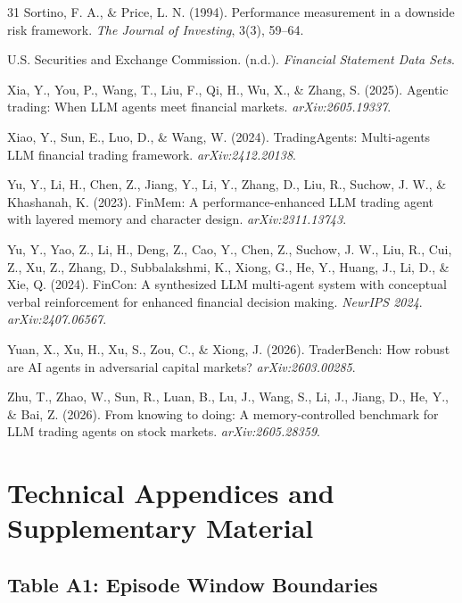 \documentclass{article}
\begin{document}
\begin{thebibliography}{31}
 Sortino, F. A., \& Price, L. N. (1994). Performance measurement in a downside risk framework. \textit{The Journal of Investing}, 3(3), 59--64.

 U.S. Securities and Exchange Commission. (n.d.). \textit{Financial Statement Data Sets}.

 Xia, Y., You, P., Wang, T., Liu, F., Qi, H., Wu, X., \& Zhang, S. (2025). Agentic trading: When LLM agents meet financial markets. \textit{arXiv:2605.19337}.

 Xiao, Y., Sun, E., Luo, D., \& Wang, W. (2024). TradingAgents: Multi-agents LLM financial trading framework. \textit{arXiv:2412.20138}.

 Yu, Y., Li, H., Chen, Z., Jiang, Y., Li, Y., Zhang, D., Liu, R., Suchow, J. W., \& Khashanah, K. (2023). FinMem: A performance-enhanced LLM trading agent with layered memory and character design. \textit{arXiv:2311.13743}.

 Yu, Y., Yao, Z., Li, H., Deng, Z., Cao, Y., Chen, Z., Suchow, J. W., Liu, R., Cui, Z., Xu, Z., Zhang, D., Subbalakshmi, K., Xiong, G., He, Y., Huang, J., Li, D., \& Xie, Q. (2024). FinCon: A synthesized LLM multi-agent system with conceptual verbal reinforcement for enhanced financial decision making. \textit{NeurIPS 2024}. \textit{arXiv:2407.06567}.

 Yuan, X., Xu, H., Xu, S., Zou, C., \& Xiong, J. (2026). TraderBench: How robust are AI agents in adversarial capital markets? \textit{arXiv:2603.00285}.

 Zhu, T., Zhao, W., Sun, R., Luan, B., Lu, J., Wang, S., Li, J., Jiang, D., He, Y., \& Bai, Z. (2026). From knowing to doing: A memory-controlled benchmark for LLM trading agents on stock markets. \textit{arXiv:2605.28359}.

\end{thebibliography}

\appendix

\section{Technical Appendices and Supplementary Material}

\subsection{Table A1: Episode Window Boundaries}
\end{document}
